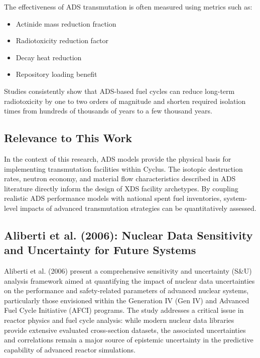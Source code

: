 The effectiveness of ADS transmutation is often measured using metrics such as:

\begin{itemize}
\item Actinide mass reduction fraction
\item Radiotoxicity reduction factor
\item Decay heat reduction
\item Repository loading benefit
\end{itemize}

Studies consistently show that ADS-based fuel cycles can reduce long-term radiotoxicity by one to two orders of magnitude and 
shorten required isolation times from hundreds of thousands of years to a few thousand years.

\subsection{Relevance to This Work}

In the context of this research, ADS models provide the physical basis for implementing transmutation facilities within Cyclus. 
The isotopic destruction rates, neutron economy, and material flow characteristics described in ADS literature directly inform the 
design of XDS facility archetypes. By coupling realistic ADS performance models with national spent fuel inventories, system-level 
impacts of advanced transmutation strategies can be quantitatively assessed.


\subsection{Aliberti et al. (2006): Nuclear Data Sensitivity and Uncertainty for Future Systems}
\label{subsec:aliberti2006}

Aliberti et al. (2006) present a comprehensive sensitivity and uncertainty (S\&U) analysis framework aimed at quantifying the 
impact of nuclear data uncertainties on the performance and safety-related parameters of advanced nuclear systems, particularly 
those envisioned within the Generation IV (Gen IV) and Advanced Fuel Cycle Initiative (AFCI) programs. The study addresses a 
critical issue in reactor physics and fuel cycle analysis: while modern nuclear data libraries provide extensive evaluated 
cross-section datasets, the associated uncertainties and correlations remain a major source of epistemic uncertainty in the 
predictive capability of advanced reactor simulations.

